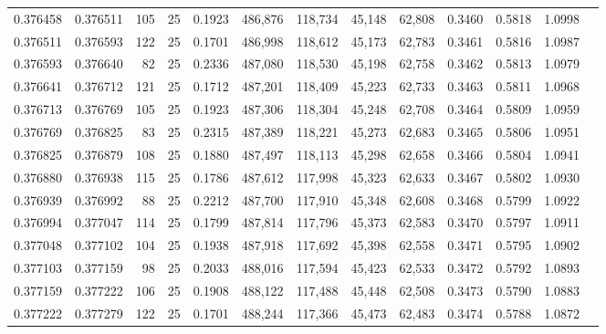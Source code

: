 \begin{tabular}{rrrrrrrrrrrrr}
0.376458 & 0.376511 &   105 &  25 &                                     0.1923 & 486,876 & 118,734 &  45,148 &  62,808 & 0.3460 & 0.5818 & 1.0998 \\
0.376511 & 0.376593 &   122 &  25 &                                     0.1701 & 486,998 & 118,612 &  45,173 &  62,783 & 0.3461 & 0.5816 & 1.0987 \\
0.376593 & 0.376640 &    82 &  25 &                                     0.2336 & 487,080 & 118,530 &  45,198 &  62,758 & 0.3462 & 0.5813 & 1.0979 \\
0.376641 & 0.376712 &   121 &  25 &                                     0.1712 & 487,201 & 118,409 &  45,223 &  62,733 & 0.3463 & 0.5811 & 1.0968 \\
0.376713 & 0.376769 &   105 &  25 &                                     0.1923 & 487,306 & 118,304 &  45,248 &  62,708 & 0.3464 & 0.5809 & 1.0959 \\
0.376769 & 0.376825 &    83 &  25 &                                     0.2315 & 487,389 & 118,221 &  45,273 &  62,683 & 0.3465 & 0.5806 & 1.0951 \\
0.376825 & 0.376879 &   108 &  25 &                                     0.1880 & 487,497 & 118,113 &  45,298 &  62,658 & 0.3466 & 0.5804 & 1.0941 \\
0.376880 & 0.376938 &   115 &  25 &                                     0.1786 & 487,612 & 117,998 &  45,323 &  62,633 & 0.3467 & 0.5802 & 1.0930 \\
0.376939 & 0.376992 &    88 &  25 &                                     0.2212 & 487,700 & 117,910 &  45,348 &  62,608 & 0.3468 & 0.5799 & 1.0922 \\
0.376994 & 0.377047 &   114 &  25 &                                     0.1799 & 487,814 & 117,796 &  45,373 &  62,583 & 0.3470 & 0.5797 & 1.0911 \\
0.377048 & 0.377102 &   104 &  25 &                                     0.1938 & 487,918 & 117,692 &  45,398 &  62,558 & 0.3471 & 0.5795 & 1.0902 \\
0.377103 & 0.377159 &    98 &  25 &                                     0.2033 & 488,016 & 117,594 &  45,423 &  62,533 & 0.3472 & 0.5792 & 1.0893 \\
0.377159 & 0.377222 &   106 &  25 &                                     0.1908 & 488,122 & 117,488 &  45,448 &  62,508 & 0.3473 & 0.5790 & 1.0883 \\
0.377222 & 0.377279 &   122 &  25 &                                     0.1701 & 488,244 & 117,366 &  45,473 &  62,483 & 0.3474 & 0.5788 & 1.0872 \\

\end{tabular}
